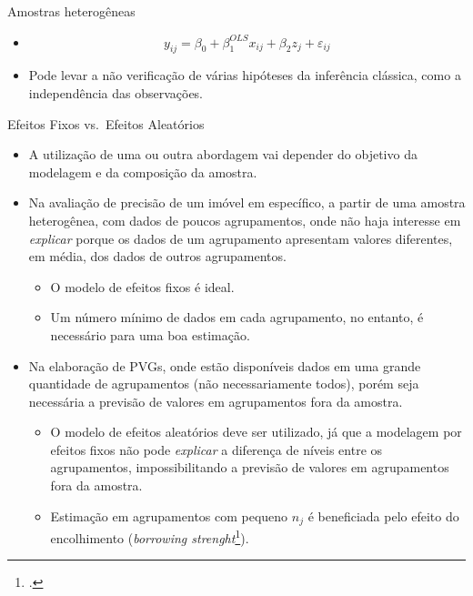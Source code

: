 \documentclass[9pt,ignorenonframetext,aspectratio=169]{beamer}
\providecommand{\tightlist}{%
  \setlength{\itemsep}{0pt}\setlength{\parskip}{0pt}}
\begin{document}
\begin{frame}{Amostras heterogêneas}
\begin{itemize}[<+->]
\begin{itemize}[<+->]
    \begin{itemize}[<+->]
    \tightlist
    \item
      \alert<8>{\begin{equation}
      y_{ij} = \beta_0 + \beta_1^{OLS} x_{ij} + \beta_2 z_j + \varepsilon_{ij}
      \end{equation}}
    \item
      \alert<9>{Pode levar a não verificação de várias hipóteses da 
      inferência clássica, como a independência das observações.}
    \end{itemize}
  \end{itemize}
\end{itemize}

\end{frame}

\begin{frame}{Efeitos Fixos vs.~Efeitos Aleatórios}
\protect\hypertarget{efeitos-fixos-vs.-efeitos-aleatuxf3rios}{}

\begin{itemize}[<+->]
\tightlist
\item
  \alert<1>{A utilização de uma ou outra abordagem vai depender do objetivo da
  modelagem e da composição da amostra.}
\item
  \alert<2>{Na avaliação de precisão de um imóvel em específico, a partir de
  uma amostra heterogênea, com dados de poucos agrupamentos, onde não haja
  interesse em \emph{explicar} porque os dados de um agrupamento apresentam
  valores diferentes, em média, dos dados de outros agrupamentos.}

  \begin{itemize}[<+->]
  \tightlist
  \item
    \alert<3>{O modelo de efeitos fixos é ideal.}
  \item
    \alert<4>{Um número mínimo de dados em cada agrupamento, no entanto, é
    necessário para uma boa estimação.}
  \end{itemize}
\end{itemize}

\begin{itemize}[<+->]
\tightlist
\item
  \alert<5>{Na elaboração de PVGs, onde estão disponíveis dados em uma grande
  quantidade de agrupamentos (não necessariamente todos), porém seja necessária a 
  previsão de valores em agrupamentos fora da amostra.}

  \begin{itemize}[<+->]
  \tightlist
  \item
    \alert<6>{O modelo de efeitos aleatórios deve ser utilizado, já que a 
    modelagem por efeitos fixos não pode \emph{explicar} a diferença de níveis entre 
    os agrupamentos, impossibilitando a previsão de valores em agrupamentos fora da
    amostra.}
  \item
    \alert<7>{Estimação em agrupamentos com pequeno $n_j$ é beneficiada pelo 
    efeito do encolhimento (\emph{borrowing strenght}\footcite[p. 196]{tukey}).}
  \end{itemize}
\end{itemize}


\end{frame}
\end{document}
